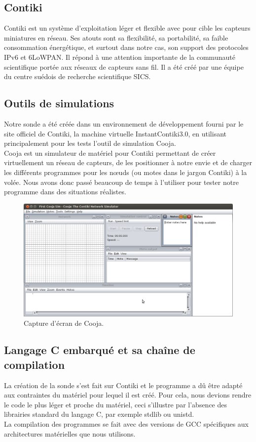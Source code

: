 	\subsection{Contiki}
	Contiki est un système d'exploitation léger et flexible avec pour cible les capteurs miniatures en réseau. Ses atouts sont sa flexibilité, sa portabilité, sa faible consommation énergétique, et surtout dans notre cas, son support des protocoles IPv6 et 6LoWPAN. Il répond à une attention importante de la communauté scientifique portée aux réseaux de capteurs sans fil. Il a été créé par une équipe du centre suédois de recherche scientifique SICS.
	
	\subsection{Outils de simulations}
	Notre sonde a été créée dans un environnement de développement fourni par le site officiel de Contiki, la machine virtuelle InstantContiki3.0, en utilisant principalement pour les tests l'outil de simulation Cooja.\\
	Cooja est un simulateur de matériel pour Contiki permettant de créer virtuellement un réseau de capteurs, de les positionner à notre envie et de charger les différents programmes pour les nœuds (ou motes dans le jargon Contiki) à la volée.
	Nous avons donc passé beaucoup de temps à l'utiliser pour tester notre programme dans des situations réalistes.
	\clearpage
	\begin{figure}[htp]
		\centering
		\includegraphics[width=16cm]{images/cooja}
		\caption{Capture d'écran de Cooja.}
		\label{fig:Cooja}
	\end{figure}

	\subsection{Langage C embarqué et sa chaîne de compilation}
	La création de la sonde s'est fait sur Contiki et le programme a dû être adapté aux contraintes du matériel pour lequel il est créé. Pour cela, nous devions rendre le code le plus léger et proche du matériel, ceci s'illustre par l'absence des librairies standard du langage C, par exemple stdlib ou unistd.\\
	La compilation des programmes se fait avec des versions de GCC spécifiques aux architectures matérielles que nous utilisons.
	
